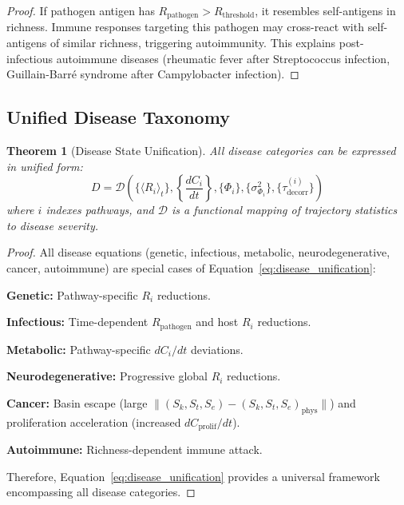 \documentclass[11pt,twocolumn,a4paper]{article}
\newtheorem{theorem}{Theorem}[section]
\theoremstyle{definition}
\theoremstyle{remark}
\newcommand{\Scoord}{(\Sk,\St,\Se)}
\newcommand{\Sk}{S_k}
\newcommand{\St}{S_t}
\newcommand{\Se}{S_e}
\newcommand{\taudecorr}{\tau_{\mathrm{decorr}}}
\begin{document}
\begin{proof}
If pathogen antigen has $R_{\mathrm{pathogen}} > R_{\mathrm{threshold}}$, it resembles self-antigens in richness. Immune responses targeting this pathogen may cross-react with self-antigens of similar richness, triggering autoimmunity. This explains post-infectious autoimmune diseases (rheumatic fever after Streptococcus infection, Guillain-Barré syndrome after Campylobacter infection).
\end{proof}

\subsection{Unified Disease Taxonomy}

\begin{theorem}[Disease State Unification]
\label{thm:disease_unification}
All disease categories can be expressed in unified form:
\begin{equation}
D = \mathcal{D}\left(\{\langle R_i \rangle_t\}, \left\{\frac{dC_i}{dt}\right\}, \{\Phi_i\}, \{\sigma_{\Phi_i}^2\}, \{\taudecorr^{(i)}\}\right)
\label{eq:disease_unification}
\end{equation}
where $i$ indexes pathways, and $\mathcal{D}$ is a functional mapping of trajectory statistics to disease severity.
\end{theorem}

\begin{proof}
All disease equations (genetic, infectious, metabolic, neurodegenerative, cancer, autoimmune) are special cases of Equation~\eqref{eq:disease_unification}:

\textbf{Genetic:} Pathway-specific $R_i$ reductions.

\textbf{Infectious:} Time-dependent $R_{\mathrm{pathogen}}$ and host $R_i$ reductions.

\textbf{Metabolic:} Pathway-specific $dC_i/dt$ deviations.

\textbf{Neurodegenerative:} Progressive global $R_i$ reductions.

\textbf{Cancer:} Basin escape (large $\|\Scoord - \Scoord_{\mathrm{phys}}\|$) and proliferation acceleration (increased $dC_{\mathrm{prolif}}/dt$).

\textbf{Autoimmune:} Richness-dependent immune attack.

Therefore, Equation~\eqref{eq:disease_unification} provides a universal framework encompassing all disease categories.
\end{proof}
\end{document}
